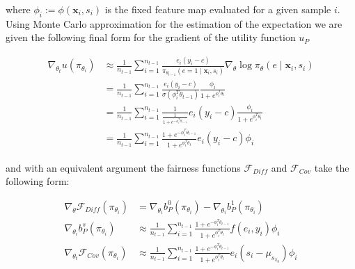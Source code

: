 \documentclass[
	a4paper,
	11pt
	]{article}
\begin{document}
where $\phi_i := \phi(\boldsymbol{x}_i, s_i)$ is the fixed feature map evaluated for a given sample $i$. Using Monte Carlo approximation for the estimation of the expectation we are given the following final form for the gradient of the utility function $u_P$

\begin{align*}
    \nabla_{\theta_t}u(\pi_{\theta_i}) &\approx \frac{1}{n_{t-1}} \sum_{i=1}^{n_{t-1}} \frac{e_i(y_i - c)}{\pi_{\theta_{t-1}}(e = 1 \mid \boldsymbol{x}_i, s_i)}\nabla_{\theta} \log \pi_\theta(e \mid \boldsymbol{x}_i, s_i) \\
    &= \frac{1}{n_{t-1}} \sum_{i=1}^{n_{t-1}} \frac{e_i(y_i - c)}{\sigma(\phi_i^T\theta_{t-1})} \frac{\phi_i}{1 + e^{\phi_i^T\theta_t}} \\
    &= \frac{1}{n_{t-1}} \sum_{i=1}^{n_{t-1}} \frac{1}{\frac{1}{1 + e^{-\phi_i^T\theta_{t-1}}}} e_i(y_i - c) \frac{\phi_i}{1 + e^{\phi_i^T\theta_t}} \\
    &= \frac{1}{n_{t-1}} \sum_{i=1}^{n_{t-1}} \frac{1 + e^{-\phi_i^T\theta_{t-1}}}{1 + e^{\phi_i^T\theta_t}} e_i(y_i - c)\phi_i 
\end{align*}

and with an equivalent argument the fairness functions $\mathcal{F}_{Diff}$ and $\mathcal{F}_{Cov}$ take the following form:

\begin{align*}
    \nabla_{\theta}\mathcal{F}_{Diff}(\pi_{\theta_i}) &= \nabla_{\theta_i}b_P^0(\pi_{\theta_i}) - \nabla_{\theta_i}b_P^1(\pi_{\theta_i}) \\
    \nabla_{\theta_i}b_P^s(\pi_{\theta_i}) &\approx \frac{1}{n_{t-1}} \sum_{i=1}^{n_{t-1}} \frac{1 + e^{-\phi_i^T\theta_{t-1}}}{1 + e^{\phi_i^T\theta_t}} f(e_i, y_i)\phi_i \\
    \nabla_{\theta_t}\mathcal{F}_{Cov}(\pi_{\theta_i}) &\approx \frac{1}{n_{t-1}} \sum_{i=1}^{n_{t-1}} \frac{1 + e^{-\phi_i^T\theta_{t-1}}}{1 + e^{\phi_i^T\theta_t}} e_i(s_i - \mu_{s_{\pi_0}})\phi_i 
\end{align*}


    
    

 

\end{document}
